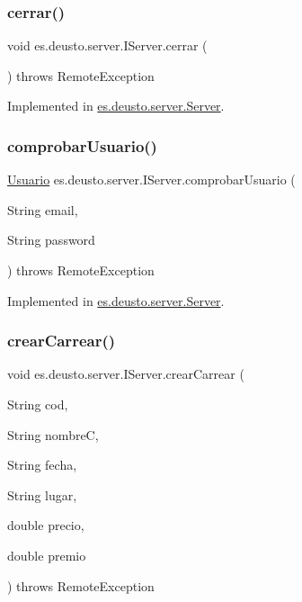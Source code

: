 \subsubsection{\texorpdfstring{cerrar()}{cerrar()}}
{\footnotesize\ttfamily void es.\+deusto.\+server.\+I\+Server.\+cerrar (\begin{DoxyParamCaption}{ }\end{DoxyParamCaption}) throws Remote\+Exception}



Implemented in \mbox{\hyperlink{classes_1_1deusto_1_1server_1_1_server_a14279d26e3b3cd38e1615f99b6c6899f}{es.\+deusto.\+server.\+Server}}.

\mbox{\label{interfacees_1_1deusto_1_1server_1_1_i_server_a864d05d99ec3891208c39d8352221656}} 
\subsubsection{\texorpdfstring{comprobarUsuario()}{comprobarUsuario()}}
{\footnotesize\ttfamily \mbox{\hyperlink{classes_1_1deusto_1_1server_1_1jdo_1_1_usuario}{Usuario}} es.\+deusto.\+server.\+I\+Server.\+comprobar\+Usuario (\begin{DoxyParamCaption}\item[{String}]{email,  }\item[{String}]{password }\end{DoxyParamCaption}) throws Remote\+Exception}



Implemented in \mbox{\hyperlink{classes_1_1deusto_1_1server_1_1_server_afa3e758715cbf321f9c1cbe08a8583a4}{es.\+deusto.\+server.\+Server}}.

\mbox{\label{interfacees_1_1deusto_1_1server_1_1_i_server_a3cb0049dde89f2d81fcc883b19a0c6cf}} 
\subsubsection{\texorpdfstring{crearCarrear()}{crearCarrear()}}
{\footnotesize\ttfamily void es.\+deusto.\+server.\+I\+Server.\+crear\+Carrear (\begin{DoxyParamCaption}\item[{String}]{cod,  }\item[{String}]{nombreC,  }\item[{String}]{fecha,  }\item[{String}]{lugar,  }\item[{double}]{precio,  }\item[{double}]{premio }\end{DoxyParamCaption}) throws Remote\+Exception}



